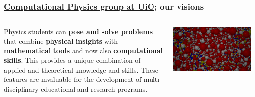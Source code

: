 \documentclass{beamer}
\begin{document}
\begin{frame}
\frametitle{\href{{http://www.mn.uio.no/fysikk/english/research/groups/computational/index.html}}{Computational Physics group at UiO}; our visions}

\begin{columns}
\begin{block}{}
Physics students can \textbf{pose and solve problems} that combine \textbf{physical insights} with \textbf{mathematical tools} and now also \textbf{computational skills}. This provides a unique combination of applied and theoretical knowledge and skills. These features are invaluable for the development of multi-disciplinary educational and research programs.
\end{block}

\centerline{\includegraphics[width=1.0\linewidth]{fig-future/md2.png}}



\end{columns}
\end{frame}
\end{document}
